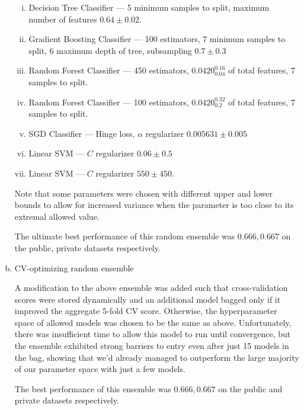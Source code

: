 \documentclass[10pt, preprint2]{aastex}
\begin{document}
\begin{enumerate}[a)]
\begin{enumerate}[i.]
            \item Decision Tree Classifier --- 5 minimum samples to split, maximum number of features $0.64 \pm 0.02$.

            \item Gradient Boosting Classifier --- 100 estimators, 7 minimum samples to split, 6 maximum depth of tree, subsampling $0.7 \pm 0.3$
            \item Random Forest Classifier --- 450 estimators, $0.0420^{0.16}_{0.04}$ of total features, 7 samples to split.
            \item Random Forest Classifier --- 100 estimators, $0.0420^{0.32}_{0.2}$ of total features, 7 samples to split.

            \item SGD Classifier --- Hinge loss, $\alpha$ regularizer $0.005631 \pm 0.005$
            \item Linear SVM --- $C$ regularizer $0.06 \pm 0.5$

            \item Linear SVM --- $C$ regularizer $550 \pm 450$.
    \end{enumerate}

        Note that some parameters were chosen with different upper and lower bounds to allow for increased variance when the parameter is too close to its extremal allowed value.

        The ultimate best performance of this random ensemble was $0.666, 0.667$ on the public, private datasets respectively.

    \item CV-optimizing random ensemble

        A modification to the above ensemble was added such that cross-validation scores were stored dynamically and an additional model bagged only if it improved the aggregate 5-fold CV score. Otherwise, the hyperparameter space of allowed models was chosen to be the same as above. Unfortunately, there was insufficient time to allow this model to run until convergence, but the ensemble exhibited strong barriers to entry even after just 15 models in the bag, showing that we'd already managed to outperform the large majority of our parameter space with just a few models.

        The best performance of this ensemble was $0.666, 0.667$ on the public and private datasets respectively.

\end{enumerate}
\end{document}
